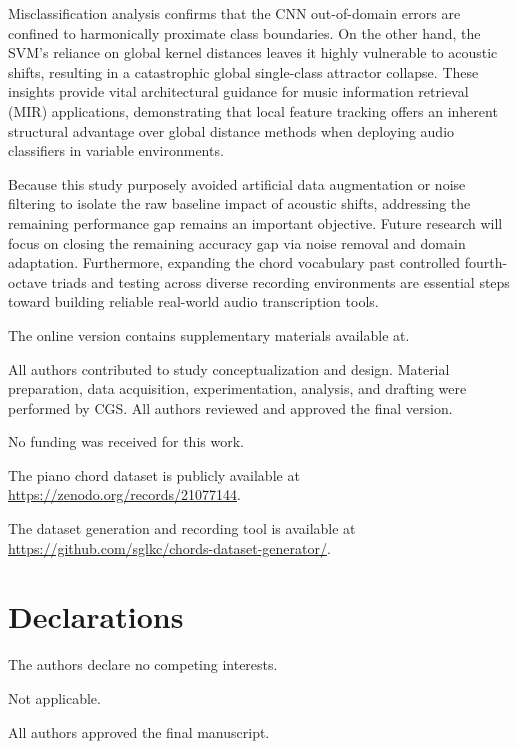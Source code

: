 \documentclass[pdflatex,sn-mathphys-num,iicol]{sn-jnl}
\theoremstyle{thmstyleone}
\theoremstyle{thmstyletwo}
\theoremstyle{thmstylethree}
\begin{document}
Misclassification analysis confirms that the CNN out-of-domain errors are confined to harmonically proximate class boundaries. On the other hand, the SVM's reliance on global kernel distances leaves it highly vulnerable to acoustic shifts, resulting in a catastrophic global single-class attractor collapse. These insights provide vital architectural guidance for music information retrieval (MIR) applications, demonstrating that local feature tracking offers an inherent structural advantage over global distance methods when deploying audio classifiers in variable environments.

Because this study purposely avoided artificial data augmentation or noise filtering to isolate the raw baseline impact of acoustic shifts, addressing the remaining performance gap remains an important objective. Future research will focus on closing the remaining accuracy gap via noise removal and domain adaptation. Furthermore, expanding the chord vocabulary past controlled fourth-octave triads and testing across diverse recording environments are essential steps toward building reliable real-world audio transcription tools.

\backmatter

The online version contains supplementary materials available at.

All authors contributed to study conceptualization and design. Material preparation, data acquisition, experimentation, analysis, and drafting were performed by CGS. All authors reviewed and approved the final version.

No funding was received for this work.

The piano chord dataset is publicly available at \url{https://zenodo.org/records/21077144}.

The dataset generation and recording tool is available at \url{https://github.com/sglkc/chords-dataset-generator/}.

\section*{Declarations}

The authors declare no competing interests.

Not applicable.

All authors approved the final manuscript.


\end{document}
